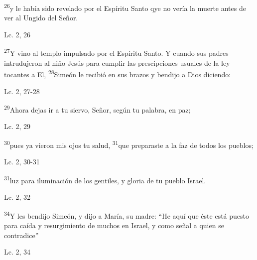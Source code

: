 \documentclass[a4paper,11pt,sans]{article}
\begin{document}
      \begin{center}
        \textsuperscript{26}y le había sido revelado por el Espíritu Santo qye no vería la muerte antes de ver al Ungido del Señor.  
      \end{center}
      
      \begin{center}
        Lc. 2, 26       
      \end{center}
      
      \begin{center}
        \textsuperscript{27}Y vino al templo impulsado por el Espíritu Santo. Y cuando sus padres intrudujeron al niño Jesús para cumplir las prescipciones usuales
        de la ley tocantes a El, \textsuperscript{28}Simeón le recibió en sus brazos y bendijo a Dios diciendo:
      \end{center}
      \begin{center}
        Lc. 2, 27-28         
      \end{center}
      
      \begin{center}
        \textsuperscript{29}Ahora dejas ir a tu siervo, Señor, según tu palabra, en paz;
      \end{center}
      \begin{center}
        Lc. 2, 29        
      \end{center}

      \begin{center}
        \textsuperscript{30}pues ya vieron mis ojos tu salud, \textsuperscript{31}que preparaste a la faz de todos los pueblos;
      \end{center}
      \begin{center}
        Lc. 2, 30-31         
      \end{center}
      
      \begin{center}
        \textsuperscript{31}luz para iluminación de los gentiles, y gloria de tu pueblo Israel.
      \end{center}
      \begin{center}
        Lc. 2, 32        
      \end{center}
      
      \begin{center}
        \textsuperscript{34}Y les bendijo Simeón, y dijo a María, su madre: ``He aquí que éste está puesto para caída y resurgimiento de muchos en Israel, y como
         señal a quien se contradice''
      \end{center}
      \begin{center}
        Lc. 2, 34       
      \end{center}
      
\end{document}
